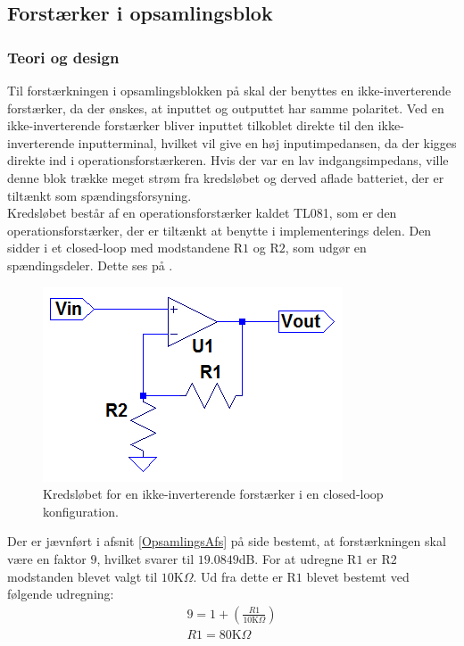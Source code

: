\subsection{Forstærker i opsamlingsblok}\label{Subsec:Forstaerker}
\subsubsection{Teori og design}
Til forstærkningen i opsamlingsblokken på  skal der benyttes en ikke-inverterende forstærker, da der ønskes, at inputtet og outputtet har samme polaritet. Ved en ikke-inverterende forstærker bliver inputtet tilkoblet direkte til den ikke-inverterende inputterminal, hvilket vil give en høj inputimpedansen, da der kigges direkte ind i operationsforstærkeren. Hvis der var en lav indgangsimpedans, ville denne blok trække meget strøm fra kredsløbet og derved aflade batteriet, der er tiltænkt som spændingsforsyning. \\
Kredsløbet består af en operationsforstærker kaldet TL081, som er den operationsforstærker, der er tiltænkt at benytte i implementerings delen. Den sidder i et closed-loop med modstandene R$1$ og R$2$, som udgør en spændingsdeler. Dette ses på .
\begin{figure}[H]
\centering
\includegraphics[scale=0.85]{figures/cProblemloesning/Forstaerker.PNG}
\caption{Kredsløbet for en ikke-inverterende forstærker i en closed-loop konfiguration.}
\label{fig:Forstaerker}
\end{figure} 

\noindent Der er jævnført i afsnit \ref{OpsamlingsAfs} på side \pageref{OpsamlingsAfs} bestemt, at forstærkningen skal være en faktor $9$, hvilket svarer til $19.0849$dB. For at udregne R$1$ er R$2$ modstanden blevet valgt til $10$K$\Omega$. Ud fra dette er R$1$ blevet bestemt ved følgende udregning:
\begin{align}
9 = 1 + (\frac{R1}{10\text{K}\Omega})\\
R1 = 80\text{K}\Omega
\end{align}

